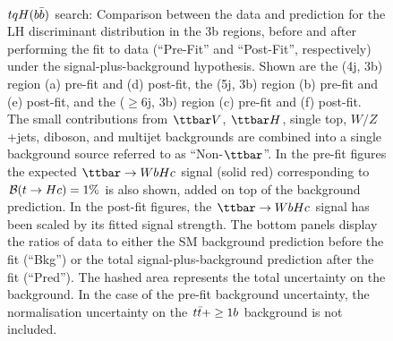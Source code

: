 \begin{figure}[htbp]
\begin{center}
 \\
\caption{\small{$tqH(b\bar{b})$ search: Comparison between the data and prediction for the LH discriminant distribution in the 3b regions,
before and after performing the fit to data  (``Pre-Fit'' and ``Post-Fit'', respectively) under the signal-plus-background hypothesis.
Shown are the (4j, 3b) region (a) pre-fit and (d) post-fit,  the (5j, 3b) region (b) pre-fit and (e) post-fit, and
the ($\geq$6j, 3b) region (c) pre-fit and (f) post-fit.
The small contributions from $\ttbar V$, $\ttbar H$, single top, $W/Z$+jets, diboson, and multijet backgrounds are combined into a single background source 
referred to as ``Non-$\ttbar$''. 
In the pre-fit figures the expected $\Hc$ signal (solid red) corresponding to $\mathcal{B}(t\to Hc)=1\%$ is also shown,
added on top of the background prediction. In the post-fit figures, the $\Hc$ signal has been scaled by its fitted signal strength.
The bottom panels display the ratios of data to either the SM background prediction before the fit (``Bkg'')  or the total signal-plus-background
prediction after the fit (``Pred''). 
The hashed area represents the total uncertainty on the background.
In the case of the pre-fit background uncertainty, the normalisation uncertainty on the $t\bar{t}+\geq1b$ background is not included. }}
\label{fig:prepostfit_unblinded_WbHc_3btagex}
\end{center}
\end{figure}

